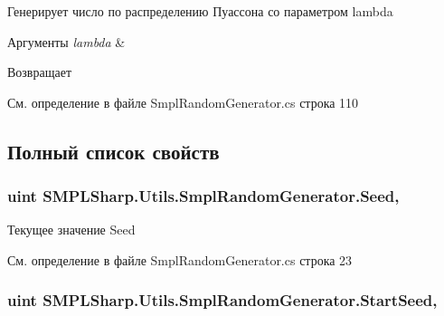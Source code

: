 Генерирует число по распределению Пуассона со параметром lambda 


\begin{DoxyParams}{Аргументы}
{\em lambda} & \\
\hline
\end{DoxyParams}
\begin{DoxyReturn}{Возвращает}

\end{DoxyReturn}


См. определение в файле Smpl\-Random\-Generator.\-cs строка 110



\subsection{Полный список свойств}
\hypertarget{class_s_m_p_l_sharp_1_1_utils_1_1_smpl_random_generator_a504f2e98704d7f18cfacc0d36be02eaf}{
\subsubsection[{Seed}]{\setlength{\rightskip}{0pt plus 5cm}uint S\-M\-P\-L\-Sharp.\-Utils.\-Smpl\-Random\-Generator.\-Seed\hspace{0.3cm}{\ttfamily [get]}, {\ttfamily [set]}}}\label{d0/d33/class_s_m_p_l_sharp_1_1_utils_1_1_smpl_random_generator_a504f2e98704d7f18cfacc0d36be02eaf}


Текущее значение Seed 



См. определение в файле Smpl\-Random\-Generator.\-cs строка 23

\hypertarget{class_s_m_p_l_sharp_1_1_utils_1_1_smpl_random_generator_a87ae75f71d8390f0980feef6e82b7d87}{
\subsubsection[{Start\-Seed}]{\setlength{\rightskip}{0pt plus 5cm}uint S\-M\-P\-L\-Sharp.\-Utils.\-Smpl\-Random\-Generator.\-Start\-Seed\hspace{0.3cm}{\ttfamily [get]}, {\ttfamily [set]}}}\label{d0/d33/class_s_m_p_l_sharp_1_1_utils_1_1_smpl_random_generator_a87ae75f71d8390f0980feef6e82b7d87}


